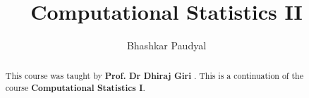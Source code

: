 \documentclass[a4paper, 11pt]{report}
\author{Bhashkar Paudyal}
\title{Computational Statistics II}
\begin{document}
\maketitle
\begin{abstract}
  This course was taught by \textbf{Prof. Dr Dhiraj Giri} .
  This is a continuation of the course \textbf{Computational Statistics I}.
\end{abstract}
\newpage
\tableofcontents


\newpage
\appendix
\appendixpage{}



\newpage
\pagestyle{plain}
\printbibliography{}
\end{document}
